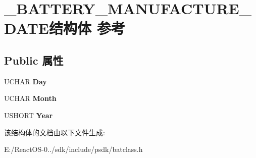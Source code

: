 \hypertarget{struct___b_a_t_t_e_r_y___m_a_n_u_f_a_c_t_u_r_e___d_a_t_e}{}\section{\+\_\+\+B\+A\+T\+T\+E\+R\+Y\+\_\+\+M\+A\+N\+U\+F\+A\+C\+T\+U\+R\+E\+\_\+\+D\+A\+T\+E结构体 参考}
\label{struct___b_a_t_t_e_r_y___m_a_n_u_f_a_c_t_u_r_e___d_a_t_e}
\subsection*{Public 属性}
\begin{DoxyCompactItemize}
\item 
\mbox{\label{struct___b_a_t_t_e_r_y___m_a_n_u_f_a_c_t_u_r_e___d_a_t_e_a9da68274915de72faf353b376b8febc8}} 
U\+C\+H\+AR {\bfseries Day}
\item 
\mbox{\label{struct___b_a_t_t_e_r_y___m_a_n_u_f_a_c_t_u_r_e___d_a_t_e_a50aeac88e6c15fc8c78393d96a6c36e0}} 
U\+C\+H\+AR {\bfseries Month}
\item 
\mbox{\label{struct___b_a_t_t_e_r_y___m_a_n_u_f_a_c_t_u_r_e___d_a_t_e_ad563779b1c6f97b12b3e87b9169e36b0}} 
U\+S\+H\+O\+RT {\bfseries Year}
\end{DoxyCompactItemize}


该结构体的文档由以下文件生成\+:\begin{DoxyCompactItemize}
\item 
E\+:/\+React\+O\+S-\/0../sdk/include/psdk/batclass.\+h\end{DoxyCompactItemize}
